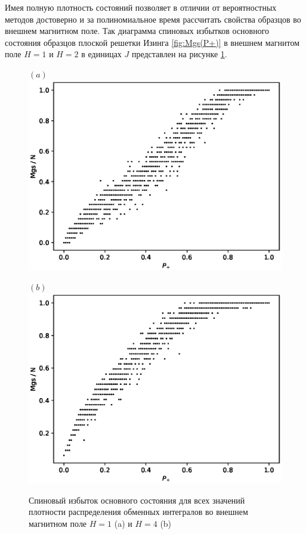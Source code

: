 \documentclass[utf8, babel, sor, jor, amsmath, amssymb, reprint]{elsarticle} %
\begin{document}
Имея полную плотность состояний позволяет в отличии от вероятностных методов достоверно и за полиномиальное время рассчитать свойства образцов во внешнем магнитном поле. Так диаграмма спиновых избытков основного состояния образцов плоской решетки Изинга \ref{fig:Mgs(P+)} в внешнем магнитом поле $H = 1$ и $H = 2$ в единицах $J$ представлен на рисунке \ref{fig:Mgs(P+)_H}.


\begin{figure}[H]
	\begin{minipage}[h]{0.45\linewidth}
		\centering $(a)$
		\includegraphics[width=1\linewidth]{images/Mgs(P+)_H1.eps}
	\end{minipage}
	\hfill
	\begin{minipage}[h]{0.45\linewidth}
		\centering $(b)$
		\includegraphics[width=1\linewidth]{images/Mgs(P+)_H2.eps}
	\end{minipage}
	\caption{Спиновый избыток основного состояния для всех значений плотности распределения обменных интегралов во внешнем магнитном поле $H = 1$ (a) и $H = 4$ (b)}
	\label{fig:Mgs(P+)_H}
\end{figure}
\end{document}
